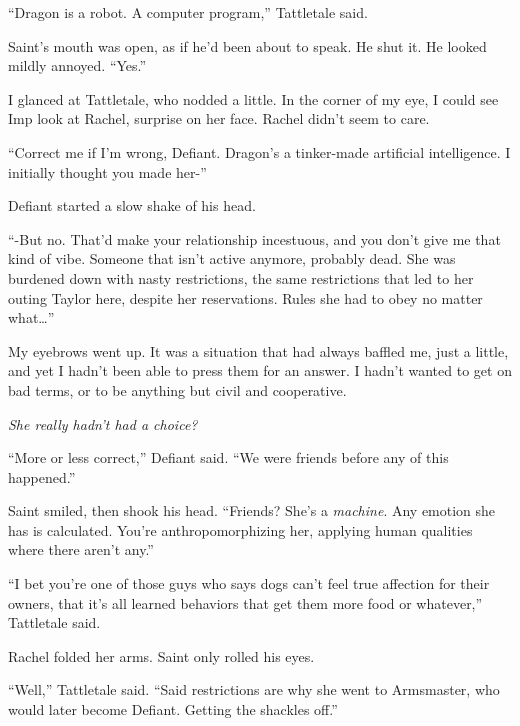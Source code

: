 ``Dragon is a robot.  A computer program,'' Tattletale said.



Saint's mouth was open, as if he'd been about to speak.  He shut it.  He looked mildly annoyed.  ``Yes.''



I glanced at Tattletale, who nodded a little.  In the corner of my eye, I could see Imp look at Rachel, surprise on her face.  Rachel didn't seem to care.



``Correct me if I'm wrong, Defiant.  Dragon's a tinker-made artificial intelligence.  I initially thought you made her-''



Defiant started a slow shake of his head.



``-But no.  That'd make your relationship incestuous, and you don't give me that kind of vibe.  Someone that isn't active anymore, probably dead.  She was burdened down with nasty restrictions, the same restrictions that led to her outing Taylor here, despite her reservations.  Rules she had to obey no matter what\ldots''



My eyebrows went up.  It was a situation that had always baffled me, just a little, and yet I hadn't been able to press them for an answer.  I hadn't wanted to get on bad terms, or to be anything but civil and cooperative.



\emph{She really hadn't had a choice?}



``More or less correct,'' Defiant said.  ``We were friends before any of this happened.''



Saint smiled, then shook his head.  ``Friends?  She's a \emph{machine}.  Any emotion she has is calculated.  You're anthropomorphizing her, applying human qualities where there aren't any.''



``I bet you're one of those guys who says dogs can't feel true affection for their owners, that it's all learned behaviors that get them more food or whatever,'' Tattletale said.



Rachel folded her arms.  Saint only rolled his eyes.



``Well,'' Tattletale said.  ``Said restrictions are why she went to Armsmaster, who would later become Defiant.  Getting the shackles off.''



